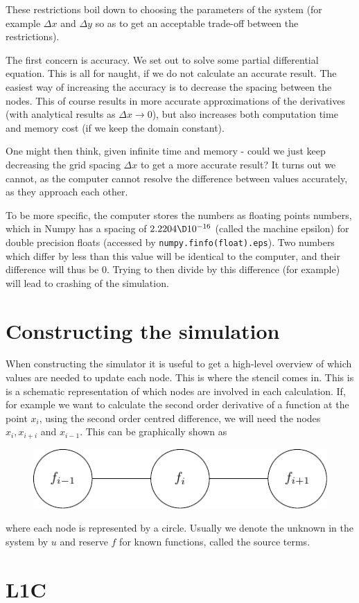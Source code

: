\documentclass[sigconf]{acmart}
\begin{document}
These restrictions boil down to choosing the parameters of the system (for example $ \Delta x $ and $ \Delta y $ so as to get an acceptable trade-off between the restrictions).

The first concern is accuracy. We set out to solve some partial differential equation. This is all for naught, if we do not calculate an accurate result. The easiest way of increasing the accuracy is to decrease the spacing between the nodes. This of course results in more accurate approximations of the derivatives (with analytical results as $ \Delta x \to 0 $), but also increases both computation time and memory cost (if we keep the domain constant).

One might then think, given infinite time and memory - could we just keep decreasing the grid spacing $ \Delta x $ to get a more accurate result? It turns out we cannot, as the computer cannot resolve the difference between values accurately, as they approach each other.

To be more specific, the computer stores the numbers as floating points numbers, which in Numpy has a spacing of $ 2.2204 \D 10^{-16} $ (called the machine epsilon) for double precision floats (accessed by \texttt{numpy.finfo(float).eps}). Two numbers which differ by less than this value will be identical to the computer, and their difference will thus be 0. Trying to then divide by this difference (for example) will lead to crashing of the simulation.

\section{Constructing the simulation}


When constructing the simulator it is useful to get a high-level overview of which values are needed to update each node. This is where the stencil comes in. This is is a schematic representation of which nodes are involved in each calculation. If, for example we want to calculate the second order derivative of a function at the point $ x_i $, using the second order centred difference, we will need the nodes $ x_i, x_{i+i} $ and $ x_{i-1} $. This can be graphically shown as
\begin{figure}[H]
	\centering
	\includegraphics{stencil1.pdf}
\end{figure}
where each node is represented by a circle. Usually we denote the unknown in the system by $ u $ and reserve $ f $ for known functions, called the source terms.



\section{L1C}
\end{document}
